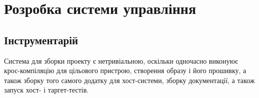 \documentclass[main.tex]{subfiles}
\begin{document}
\chapter{Розробка системи управління}

\section{Інструментарій}

Система для зборки проекту є нетривіальною, оскільки одночасно виконуює крос-компіляцію для цільового пристрою, створення образу і його прошивку, а також зборку того самого додатку для хост-системи, зборку документації, а також запуск хост- і таргет-тестів.
\end{document}
